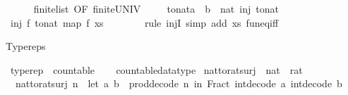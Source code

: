 \begin{isabellebody}
\ \ \ \ \isamarkupfalse%
\ finite{\isacharunderscore}list\ {\isacharbrackleft}OF\ finite{\isacharunderscore}UNIV{\isacharbrackright}\ \isacommand{{\isachardot}{\isachardot}}\isamarkupfalse%
\isanewline
\ \ \isamarkupfalse%
\ {\isachardoublequoteopen}{\isasymexists}to{\isacharunderscore}nat{\isacharcolon}{\isacharcolon}{\isacharparenleft}{\isacharprime}a\ {\isasymRightarrow}\ {\isacharprime}b{\isacharparenright}\ {\isasymRightarrow}\ nat{\isachardot}\ inj\ to{\isacharunderscore}nat{\isachardoublequoteclose}\isanewline
\ \ \isamarkupfalse%
\isanewline
\ \ \ \ \isamarkupfalse%
\ {\isachardoublequoteopen}inj\ {\isacharparenleft}{\isasymlambda}f{\isachardot}\ to{\isacharunderscore}nat\ {\isacharparenleft}map\ f\ xs{\isacharparenright}{\isacharparenright}{\isachardoublequoteclose}\isanewline
\ \ \ \ \ \ \isamarkupfalse%
\ {\isacharparenleft}rule\ injI{\isacharcomma}\ simp\ add{\isacharcolon}\ xs\ fun{\isacharunderscore}eq{\isacharunderscore}iff{\isacharparenright}\isanewline
\ \ \isamarkupfalse%
\isanewline
{}\isamarkupfalse%
%
\endisatagproof
{\isafoldproof}%
%
\isadelimproof
%
\endisadelimproof
%
\begin{isamarkuptext}%
Typereps%
\end{isamarkuptext}\isamarkuptrue%
\isamarkupfalse%
\ typerep\ {\isacharcolon}{\isacharcolon}\ countable\isanewline
%
\isadelimproof
\ \ %
\endisadelimproof
%
\isatagproof
{}\isamarkupfalse%
\ countable{\isacharunderscore}datatype%
\endisatagproof
{\isafoldproof}%
%
\isadelimproof
%
\endisadelimproof
%
\isadelimdocument
%
\endisadelimdocument
%
\isatagdocument
%
\isamarkuptrue%
%
\endisatagdocument
{\isafolddocument}%
%
\isadelimdocument
%
\endisadelimdocument
{}\isamarkupfalse%
\ nat{\isacharunderscore}to{\isacharunderscore}rat{\isacharunderscore}surj\ {\isacharcolon}{\isacharcolon}\ {\isachardoublequoteopen}nat\ {\isasymRightarrow}\ rat{\isachardoublequoteclose}\ \isanewline
\ \ {\isachardoublequoteopen}nat{\isacharunderscore}to{\isacharunderscore}rat{\isacharunderscore}surj\ n\ {\isacharequal}\ {\isacharparenleft}let\ {\isacharparenleft}a{\isacharcomma}\ b{\isacharparenright}\ {\isacharequal}\ prod{\isacharunderscore}decode\ n\ in\ Fract\ {\isacharparenleft}int{\isacharunderscore}decode\ a{\isacharparenright}\ {\isacharparenleft}int{\isacharunderscore}decode\ b{\isacharparenright}{\isacharparenright}{\isachardoublequoteclose}\isanewline

\end{isabellebody}
